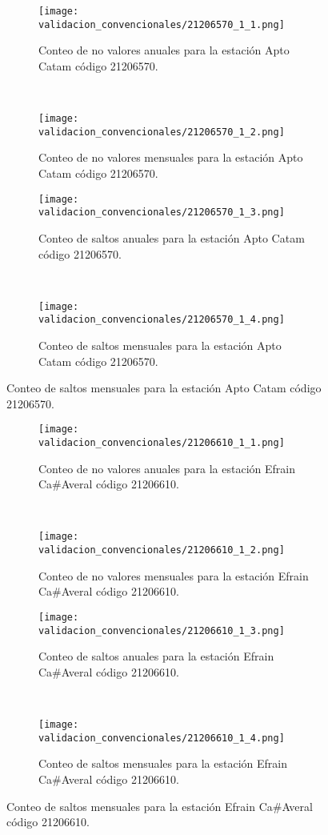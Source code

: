 \begin{figure}[H]\ContinuedFloat
\centering
	\begin{subfigure}[normla]{0.4\textwidth}
	\texttt{[image: validacion\_convencionales/21206570\_1\_1.png]}
		\caption{Conteo de no valores anuales para la estación Apto Catam código 21206570.}
		\label{subfig:a1}
		\end{subfigure}
		~
    \begin{subfigure}[normla]{0.4\textwidth}
	\texttt{[image: validacion\_convencionales/21206570\_1\_2.png]}
		\caption{Conteo de no valores mensuales para la estación Apto Catam código 21206570.}
		\label{subfig:a2}
		\end{subfigure}
		
    \begin{subfigure}[normla]{0.4\textwidth}
	\texttt{[image: validacion\_convencionales/21206570\_1\_3.png]}
		\caption{Conteo de saltos anuales para la estación Apto Catam código 21206570.}
		\label{subfig:a1}
		\end{subfigure}
		~
    \begin{subfigure}[normla]{0.4\textwidth}
	\texttt{[image: validacion\_convencionales/21206570\_1\_4.png]}
		\caption{Conteo de saltos mensuales para la estación Apto Catam código 21206570.}
		\label{subfig:a2}
		\end{subfigure}

	
\end{figure}
           
\begin{figure}[H]\ContinuedFloat
\centering
	\begin{subfigure}[normla]{0.4\textwidth}
	\texttt{[image: validacion\_convencionales/21206610\_1\_1.png]}
		\caption{Conteo de no valores anuales para la estación Efrain Ca#Averal código 21206610.}
		\label{subfig:a1}
		\end{subfigure}
		~
    \begin{subfigure}[normla]{0.4\textwidth}
	\texttt{[image: validacion\_convencionales/21206610\_1\_2.png]}
		\caption{Conteo de no valores mensuales para la estación Efrain Ca#Averal código 21206610.}
		\label{subfig:a2}
		\end{subfigure}
		
    \begin{subfigure}[normla]{0.4\textwidth}
	\texttt{[image: validacion\_convencionales/21206610\_1\_3.png]}
		\caption{Conteo de saltos anuales para la estación Efrain Ca#Averal código 21206610.}
		\label{subfig:a1}
		\end{subfigure}
		~
    \begin{subfigure}[normla]{0.4\textwidth}
	\texttt{[image: validacion\_convencionales/21206610\_1\_4.png]}
		\caption{Conteo de saltos mensuales para la estación Efrain Ca#Averal código 21206610.}
		\label{subfig:a2}
		\end{subfigure}

	
\end{figure}
           
